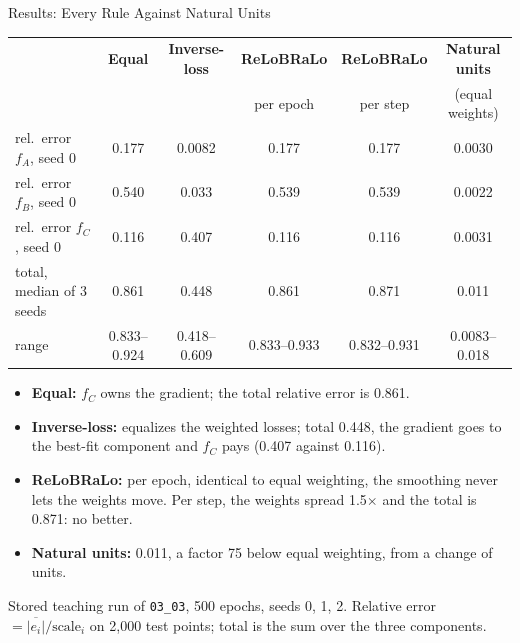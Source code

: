 \documentclass[aspectratio=169,11pt]{beamer}
\newcommand{\emphc}[1]{\textcolor{harvardcrimson}{#1}}
\begin{document}
\begin{frame}{Results: Every Rule Against Natural Units}
\footnotesize
\vspace{-0.1cm}
\begin{center}
\renewcommand{\arraystretch}{0.95}
\setlength{\tabcolsep}{4pt}
{\footnotesize
\begin{tabular}{@{}lccccc@{}}
\toprule
 & \textbf{Equal} & \textbf{Inverse-loss} & \textbf{ReLoBRaLo} & \textbf{ReLoBRaLo} & \textbf{Natural units} \\
 & & & per epoch & per step & (equal weights) \\
\midrule
rel.\ error $f_A$, seed 0 & 0.177 & 0.0082 & 0.177 & 0.177 & 0.0030 \\
rel.\ error $f_B$, seed 0 & 0.540 & 0.033 & 0.539 & 0.539 & 0.0022 \\
rel.\ error $f_C$, seed 0 & 0.116 & 0.407 & 0.116 & 0.116 & 0.0031 \\
\midrule
total, median of 3 seeds & 0.861 & 0.448 & 0.861 & 0.871 & \emphc{0.011} \\
range & 0.833--0.924 & 0.418--0.609 & 0.833--0.933 & 0.832--0.931 & 0.0083--0.018 \\
\bottomrule
\end{tabular}
}
\end{center}

\vspace{0.15cm}
\begin{itemize}\itemsep0pt
    \item \textbf{Equal:} $f_C$ owns the gradient; the total relative error is 0.861.
    \item \textbf{Inverse-loss:} equalizes the weighted losses; total 0.448, the gradient goes to the best-fit component and $f_C$ pays (0.407 against 0.116).
    \item \textbf{ReLoBRaLo:} per epoch, identical to equal weighting, the smoothing never lets the weights move. Per step, the weights spread 1.5$\times$ and the total is 0.871: no better.
    \item \textbf{Natural units:} 0.011, a factor 75 below equal weighting, from a change of units.
\end{itemize}

{\scriptsize Stored teaching run of \texttt{03\_03}, 500 epochs, seeds 0, 1, 2. Relative error $= \overline{|e_i|}/\text{scale}_i$ on 2,000 test points; total is the sum over the three components.}
\end{frame}
\end{document}
